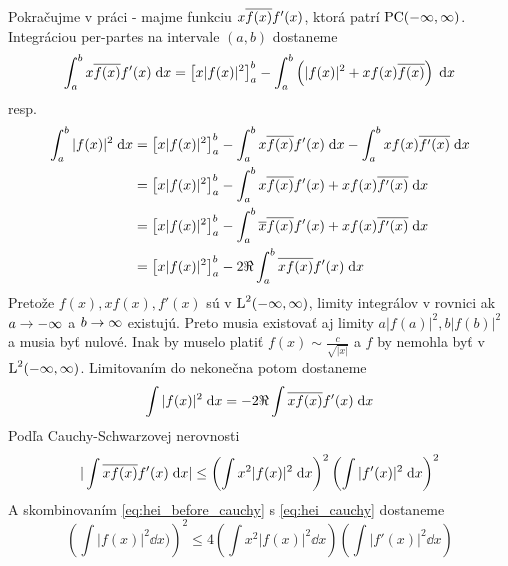 \begin{dokaz}
    Pokračujme v práci - majme funkciu $x\overline{f(x)}f'(x)$, ktorá patrí $\mbox{PC}(-\infty,\infty)$. 
    Integráciou per-partes na intervale $(a,b)$ dostaneme
    \begin{equation}
        \int_a^b x\overline{f(x)}f'(x) \; \mathrm{d} x =
          \left[ x|f(x)|^2\right]_a^b -
          \int_a^b \left(|f(x)|^2 + x f(x) \overline{f(x)} \right)
            \; \mathrm{d} x
    \end{equation}
    resp.
    \begin{equation}
    \begin{split}
        \int_a^b |f(x)|^2 \; \mathrm{d} x &=
          \left[ x|f(x)|^2\right]_a^b 
        - \int_a^b x\overline{f(x)}f'(x) \; \mathrm{d} x -
          \int_a^b x f(x) \overline{f'(x)} \; \mathrm{d} x \\
        &= \left[ x|f(x)|^2\right]_a^b 
        - \int_a^b x\overline{f(x)}f'(x) + x f(x) \overline{f'(x)} \; \mathrm{d} x
          \\
        &= \left[ x|f(x)|^2\right]_a^b 
        - \int_a^b \overline{x} \overline{f(x)}f'(x) + x f(x)
          \overline{f'(x)} \; \mathrm{d} x\\
        &= \left[ x|f(x)|^2\right]_a^b 
        - 2 \Re \int_a^b \overline{xf(x)}f'(x) \; \mathrm{d} x
    \end{split}
    \end{equation}
    Pretože $f(x),x f(x), f'(x)$ sú v $\mbox{L}^2(-\infty,\infty)$, limity integrálov
    v rovnici ak $a\rightarrow-\infty$ a $b\rightarrow\infty$ existujú.
    Preto musia existovať aj limity $a |f(a)|^2, b |f(b)|^2$ a musia
    byť nulové. Inak by muselo platiť
    $f(x)\sim\frac{c}{\sqrt{|x|}}$ a $f$ by nemohla byť v $\mbox{L}^2(-\infty,\infty)$.
    Limitovaním do nekonečna potom dostaneme
    \begin{equation}
        \int |f(x)|^2 \; \mathrm{d} x= - 2 \Re \int \overline{x f(x)}f'(x) \; \mathrm{d} x
        \label{eq:hei_before_cauchy}
    \end{equation}
    Podľa  Cauchy-Schwarzovej nerovnosti
    \begin{equation}
        |\int \overline{x f(x)}f'(x) \; \mathrm{d} x| \le
            \left( \int x^2 |f(x)|^2 \; \mathrm{d} x \right)^2
            \left( \int |f'(x)|^2 \; \mathrm{d} x \right)^2
        \label{eq:hei_cauchy}
    \end{equation}
    A skombinovaním \ref{eq:hei_before_cauchy} s \ref{eq:hei_cauchy}
    dostaneme
    \begin{equation}
        \left( \int |f(x)|^2 \dd x)\right)^2 \le 4
            \left( \int x^2 |f(x)|^2 \dd x \right)
            \left( \int |f'(x)|^2 \dd x \right)            
        \label{eq:hei_after_cauchy}
    \end{equation}

\end{dokaz}
